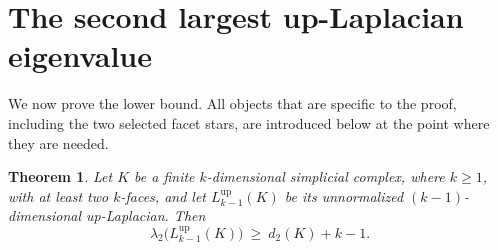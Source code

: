 \documentclass[11pt,reqno]{amsart}
\numberwithin{equation}{section}
\theoremstyle{plain}
\newtheorem{theorem}{Theorem}[section]
\theoremstyle{definition}
\newcommand{\Lup}{L^{\mathrm{up}}}
\begin{document}
\section{The second largest up-Laplacian eigenvalue}\label{sec:second}

We now prove the lower bound. All objects that are specific to the proof, including the two
selected facet stars, are introduced below at the point where they are needed.

\begin{theorem}\label{thm:main}
Let $K$ be a finite $k$-dimensional simplicial complex, where $k\ge1$, with at least two
$k$-faces, and let $\Lup_{k-1}(K)$ be its unnormalized $(k-1)$-dimensional up-Laplacian. Then
\[
  \lambda_2\bigl(\Lup_{k-1}(K)\bigr)\ \ge\ d_2(K)+k-1 .
\]
\end{theorem}
\end{document}
